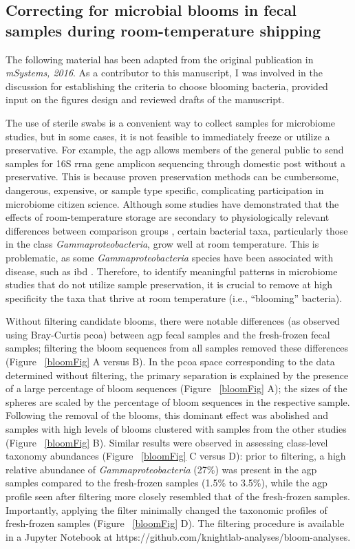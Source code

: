 \subsection{Correcting for microbial blooms in fecal samples during room-temperature shipping}\label{subsection_bloom}
The following material has been adapted from the original publication in
\textsl{mSystems, 2016}. As a contributor to this manuscript, I was involved in
the discussion for establishing the criteria to choose blooming bacteria, provided
input on the figures design and reviewed drafts of the manuscript.

The use of sterile swabs is a convenient way to collect samples for microbiome studies,
but in some cases, it is not feasible to immediately freeze or utilize a preservative.
For example, the \gls{agp} allows members of the general public to send samples for 16S
\gls{rrna} gene amplicon sequencing through domestic post without a preservative.
This is because proven preservation methods can be cumbersome, dangerous, expensive,
or sample type specific, complicating participation in microbiome citizen science.
Although some studies have demonstrated that the effects of room-temperature storage
are secondary to physiologically relevant differences between comparison groups
\cite{Song2016, Sinha2016, Lauber2010}, certain bacterial taxa,
particularly those in the class \emph{Gammaproteobacteria}, grow well at room temperature.
This is problematic, as some \emph{Gammaproteobacteria} species have been associated
with disease, such as \gls{ibd} \cite{Gevers2014}. Therefore, to identify meaningful
patterns in microbiome studies that do not utilize sample preservation, it is crucial
to remove at high specificity the taxa that thrive at room temperature (i.e., “blooming” bacteria).

Without filtering candidate blooms, there were notable differences (as observed using Bray-Curtis
\gls{pcoa}) between \gls{agp} fecal samples and the fresh-frozen fecal samples;
filtering the bloom sequences from all samples removed these differences (Figure ~\ref{bloomFig} A versus B).
In the \gls{pcoa} space corresponding to the data determined without filtering, the primary
separation is explained by the presence of a large percentage of bloom sequences (Figure ~\ref{bloomFig} A);
the sizes of the spheres are scaled by the percentage of bloom sequences in the respective sample.
Following the removal of the blooms, this dominant effect was abolished and samples with high levels of
blooms clustered with samples from the other studies (Figure ~\ref{bloomFig} B). Similar results were observed
in assessing class-level taxonomy abundances (Figure ~\ref{bloomFig} C versus D): prior to filtering,
a high relative abundance of \emph{Gammaproteobacteria} (27\%) was present in the \gls{agp} samples
compared to the fresh-frozen samples (1.5\% to 3.5\%), while the \gls{agp} profile seen after filtering
more closely resembled that of the fresh-frozen samples. Importantly, applying the filter minimally
changed the taxonomic profiles of fresh-frozen samples (Figure ~\ref{bloomFig} D). The filtering
procedure is available in a Jupyter Notebook \cite{Perez2007} at https://github.com/knightlab-analyses/bloom-analyses.

